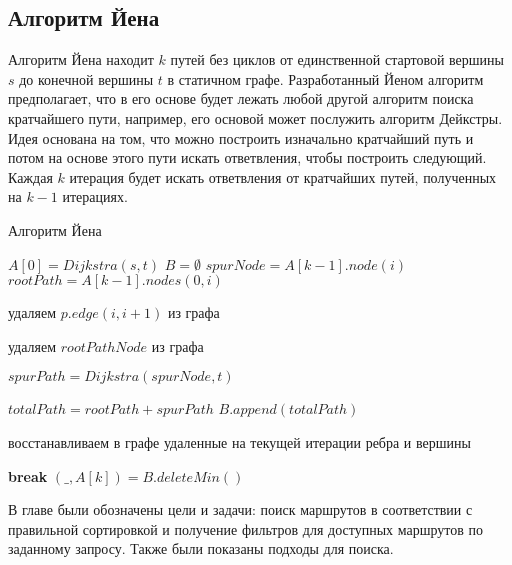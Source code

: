 \subsection{Алгоритм Йена}
Алгоритм Йена находит $k$ путей без циклов от единственной стартовой вершины $s$ до конечной вершины $t$ в статичном графе. Разработанный Йеном алгоритм предполагает, что в его основе будет лежать любой другой алгоритм поиска кратчайшего пути, например, его основой может послужить алгоритм Дейкстры. Идея основана на том, что можно построить изначально кратчайший путь и потом на основе этого пути искать ответвления, чтобы построить следующий. Каждая $k$ итерация будет искать ответвления от кратчайших путей, полученных на $k-1$ итерациях.
\begin{algorithm}[!h]
	\caption{Алгоритм Йена}\label{lst2}
	\begin{algorithmic}
		\State $A[0] = Dijkstra(s, t)$ 
		\State $B = \emptyset$ 
			\For{$i = 0$ to $size(A[k-1]) - 1] $}
				\State $spurNode = A[k-1].node(i)$ 
				\State $rootPath = A[k-1].nodes(0, i)$ 
				
						\State удаляем $p.edge(i, i+1)$ из графа
					\EndIf
				\EndFor
				
						\State удаляем $rootPathNode$ из графа
					\EndIf
				\EndFor
				
				\State $spurPath = Dijkstra(spurNode, t)$ 
				
				\State $totalPath = rootPath + spurPath$ 
				\State $B.append(totalPath)$ 
				
				\State восстанавливаем в графе удаленные на текущей итерации ребра и вершины
			\EndFor
			
				\State \textbf{break}
			\EndIf
			\State $(\_, A[k]) = B.deleteMin()$
		\EndFor
		\EndFunction
	\end{algorithmic}
\end{algorithm}

\chapterconclusion
В главе были обозначены цели и задачи: поиск маршрутов в соответствии с правильной сортировкой и получение фильтров для доступных маршрутов по заданному запросу. Также были показаны подходы для поиска.